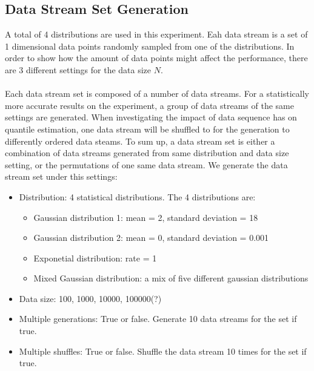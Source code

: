\documentclass[12pt]{article}
\begin{document}
\subsection{Data Stream Set Generation}
A total of 4 distributions are used in this experiment.
Eah data stream is a set of 1 dimensional data points randomly sampled from one of the distributions. In order to show how the amount of data points might affect the performance, there are 3 different settings for the data size $N$. 
\\\\
Each data stream set is composed of a number of data streams. For a statistically more accurate results on the experiment, a group of data streams of the same settings are generated. When investigating the impact of data sequence has on quantile estimation, one data stream will be shuffled to for the generation to differently ordered data steams. To sum up, a data stream set is either a combination of data streams generated from same distribution and data size setting, or the permutations of one same data stream. We generate the data stream set under this settings:

\begin{itemize}
    \item Distribution: 4 statistical distributions. The 4 distributions are:
        \begin{itemize}
            \item Gaussian distribution 1: mean = 2, standard deviation = 18
            \item Gaussian distribution 2: mean = 0, standard deviation = 0.001
            \item Exponetial distribution: rate = 1
            \item Mixed Gaussian distribution: a mix of five different gaussian distributions
        \end{itemize}
    \item Data size: 100, 1000, 10000, 100000(?)
    \item Multiple generations: True or false. Generate 10 data streams for the set if true.
    \item Multiple shuffles:  True or false. Shuffle the data stream 10 times for the set if true.
\end{itemize}
\end{document}
